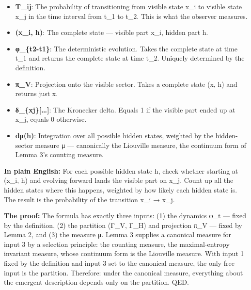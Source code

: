 \documentclass[
]{article}
\providecommand{\tightlist}{%
  \setlength{\itemsep}{0pt}\setlength{\parskip}{0pt}}
\begin{document}
\begin{itemize}
\tightlist
\item
  \textbf{T\_ij}: The probability of transitioning from visible state
  x\_i to visible state x\_j in the time interval from t\_1 to t\_2.
  This is what the observer measures.
\item
  \textbf{(x\_i, h)}: The complete state --- visible part x\_i, hidden
  part h.
\item
  \textbf{φ\_\{t2-t1\}}: The deterministic evolution. Takes the complete
  state at time t\_1 and returns the complete state at time t\_2.
  Uniquely determined by the definition.
\item
  \textbf{π\_V}: Projection onto the visible sector. Takes a complete
  state (x, h) and returns just x.
\item
  \textbf{δ\_\{xj\}{[}\ldots{]}}: The Kronecker delta. Equals 1 if the
  visible part ended up at x\_j, equals 0 otherwise.
\item
  \textbf{dμ(h)}: Integration over all possible hidden states, weighted
  by the hidden-sector measure μ --- canonically the Liouville measure,
  the continuum form of Lemma 3's counting measure.
\end{itemize}

\textbf{In plain English:} For each possible hidden state h, check
whether starting at (x\_i, h) and evolving forward lands the visible
part on x\_j. Count up all the hidden states where this happens,
weighted by how likely each hidden state is. The result is the
probability of the transition x\_i → x\_j.

\textbf{The proof:} The formula has exactly three inputs: (1) the
dynamics φ\_t --- fixed by the definition, (2) the partition (Γ\_V,
Γ\_H) and projection π\_V --- fixed by Lemma 2, and (3) the measure μ.
Lemma 3 supplies a canonical measure for input 3 by a selection
principle: the counting measure, the maximal-entropy invariant measure,
whose continuum form is the Liouville measure. With input 1 fixed by the
definition and input 3 set to the canonical measure, the only free input
is the partition. Therefore: under the canonical measure, everything
about the emergent description depends only on the partition. QED.
\end{document}
